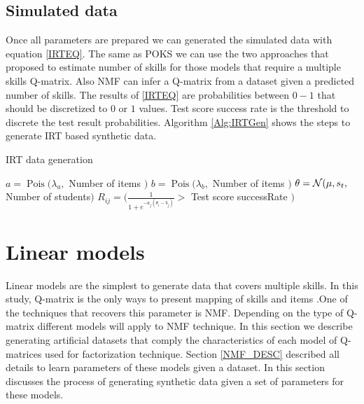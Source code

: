 \subsection{Simulated data}

Once all parameters are prepared we can generated the simulated data with equation \ref{IRTEQ}. The same as POKS we can use the two approaches that \citet{Beheshti2012Numbers} proposed to estimate number of skills for those models that require a multiple skills Q-matrix. Also NMF can infer a Q-matrix from a dataset given a predicted number of skills. The results of \ref{IRTEQ} are probabilities between $0-1$ that should be discretized to $0$ or $1$ values. Test score success rate is the threshold to discrete the test result probabilities. Algorithm \ref{Alg:IRTGen} shows the steps to generate IRT based synthetic data.


\begin{algorithm}
\caption{IRT data generation}
\label{CHalgorithm}
\begin{algorithmic}[1]
\State $a = \operatorname{Pois} ({\lambda_a},$ Number of items $)$
\State $b = \operatorname{Pois} ({\lambda_b},$ Number of items $)$
\State $\theta = \mathcal{N}(\mu, s_t ,$ Number of students$)$
\State $R_{ij} = (\frac{1}{1+e^{-a_j(\theta_i-b_j)}} >$ Test score successRate $)$
\EndFor
\EndFor
\end{algorithmic}
\label{Alg:IRTGen}
\end{algorithm}






\section{Linear models}
Linear models are the simplest to generate data that covers multiple skills. In this study, Q-matrix is the only ways to present mapping of skills and items .One of the techniques that recovers this parameter is NMF. Depending on the type of Q-matrix different models will apply to NMF technique. In this section we describe generating artificial datasets that comply the characteristics of each model of Q-matrices used for factorization technique. Section \ref{NMF_DESC} described all details to learn parameters of these models given a dataset. In this section discusses the process of generating synthetic data given a set of parameters for these models.

